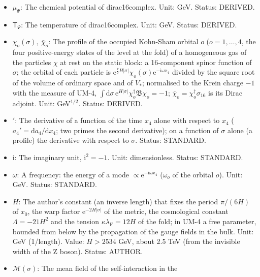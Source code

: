 \documentclass[
  10pt,
]{article}
\begin{document}
\begin{itemize}
  \(E\): An energy: \(E_o\) the energy of the Kohn-Sham orbital \(o\);
  in the neutrino sector the energy of a neutrino. Unit: GeV. Status:
  STANDARD.
\item
  \(\mu_\Psi\): The chemical potential of dirac16complex. Unit: GeV.
  Status: DERIVED.
\item
  \(\mathsf{T}_\Psi\): The temperature of dirac16complex. Unit: GeV.
  Status: DERIVED.
\item
  \(\chi_o(\sigma),\ \bar\chi_o\): The profile of the occupied Kohn-Sham
  orbital \(o\) (\(o = 1, \dots, 4\), the four positive-energy states of
  the level at the fold) of a homogeneous gas of the particles \(\chi\)
  at rest on the static block: a 16-component spinor function of
  \(\sigma\); the orbital of each particle is
  \(\mathrm{e}^{\frac72H\lvert\sigma\rvert}\chi_o(\sigma)\mathrm{e}^{-\mathrm{i}\omega x_4}\)
  divided by the square root of the volume of ordinary space and of
  \(V_*\); normalised to the Krein charge \(-1\) with the measure of
  UM-4,
  \(\int\mathrm{d}\sigma\,\mathrm{e}^{H\lvert\sigma\rvert}\chi_o^\dagger\mathfrak{B}\chi_o = -1\);
  \(\bar\chi_o = \chi_o^\dagger\sigma_{16}\) is its Dirac adjoint. Unit:
  GeV\(^{1/2}\). Status: DERIVED.
\item
  \({}'\): The derivative of a function of the time \(x_4\) alone with
  respect to \(x_4\) (\(a_4' = \mathrm{d}a_4/\mathrm{d}x_4\); two primes
  the second derivative); on a function of \(\sigma\) alone (a profile)
  the derivative with respect to \(\sigma\). Status: STANDARD.
\item
  \(\mathrm{i}\): The imaginary unit, \(\mathrm{i}^2 = -1\). Unit:
  dimensionless. Status: STANDARD.
\item
  \(\omega\): A frequency: the energy of a mode
  \(\propto \mathrm{e}^{-\mathrm{i}\omega x_4}\) (\(\omega_o\) of the
  orbital \(o\)). Unit: GeV. Status: STANDARD.
\item
  \(H\): The author's constant (an inverse length) that fixes the period
  \(\pi/(6H)\) of \(x_0\), the warp factor
  \(\mathrm{e}^{-2H\lvert\sigma\rvert}\) of the metric, the cosmological
  constant \(\Lambda = -21H^2\) and the tension
  \(\kappa\lambda_{\mathrm{F}} = 12H\) of the fold; in UM-4 a free
  parameter, bounded from below by the propagation of the gauge fields
  in the bulk. Unit: GeV (1/length). Value: \(H > 2534\) GeV, about 2.5
  TeV (from the invisible width of the Z boson). Status: AUTHOR.
\item
  \(\mathcal{M}(\sigma)\): The mean field of the self-interaction in the

\end{itemize}
\end{document}

